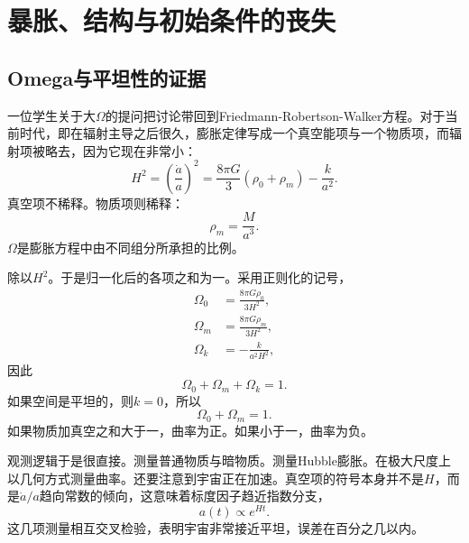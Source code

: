 \chapter{暴胀、结构与初始条件的丧失}

\section{Omega与平坦性的证据}

一位学生关于大\(\Omega\)的提问把讨论带回到Friedmann-Robertson-Walker方程。对于当前时代，即在辐射主导之后很久，膨胀定律写成一个真空能项与一个物质项，而辐射项被略去，因为它现在非常小：
\begin{equation}
H^2=\left(\frac{\dot a}{a}\right)^2=\frac{8\pi G}{3}\left(\rho_0+\rho_m\right)-\frac{k}{a^2}.
\end{equation}
真空项不稀释。物质项则稀释：
\begin{equation}
\rho_m=\frac{M}{a^3}.
\end{equation}
\(\Omega\)是膨胀方程中由不同组分所承担的比例。

除以\(H^2\)。于是归一化后的各项之和为一。采用正则化的记号，
\begin{equation}
\begin{aligned}
\Omega_0&=\frac{8\pi G\rho_0}{3H^2},\\
\Omega_m&=\frac{8\pi G\rho_m}{3H^2},\\
\Omega_k&=-\frac{k}{a^2H^2},
\end{aligned}
\end{equation}
因此
\begin{equation}
\Omega_0+\Omega_m+\Omega_k=1.
\end{equation}
如果空间是平坦的，则\(k=0\)，所以
\begin{equation}
\Omega_0+\Omega_m=1.
\end{equation}
如果物质加真空之和大于一，曲率为正。如果小于一，曲率为负。

观测逻辑于是很直接。测量普通物质与暗物质。测量Hubble膨胀。在极大尺度上以几何方式测量曲率。还要注意到宇宙正在加速。真空项的符号本身并不是\(H\)，而是\(\dot a/a\)趋向常数的倾向，这意味着标度因子趋近指数分支，
\begin{equation}
a(t)\propto e^{Ht}.
\end{equation}
这几项测量相互交叉检验，表明宇宙非常接近平坦，误差在百分之几以内。

\begin{classroomqa}
\end{classroomqa}

